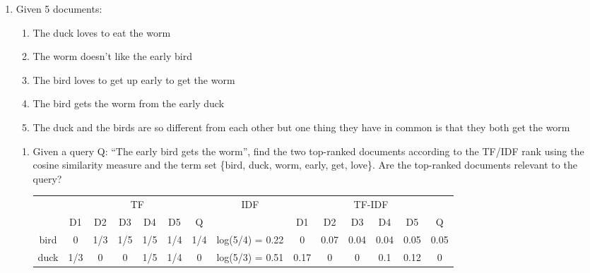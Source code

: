 \documentclass{article}
\newenvironment{QandA}{\begin{enumerate}[label=\arabic*.]}{\end{enumerate}}
\newenvironment{InnerQandA}{\begin{enumerate}[label=\roman*.]}{\end{enumerate}}
\begin{document}
\begin{QandA}
    \item Given 5 documents:
    \begin{enumerate}[label=D\arabic*:]
        \item The duck loves to eat the worm
        \item The worm doesn’t like the early bird
        \item The bird loves to get up early to get the worm
        \item The bird gets the worm from the early duck
        \item The duck and the birds are so different from each other but one thing they have in common is that they both get the worm
    \end{enumerate}
    \begin{InnerQandA}
        \item Given a query Q: ``The early bird gets the worm'', find the two top-ranked documents according to the TF/IDF rank using the cosine similarity measure and the term set \{bird, duck, worm, early, get, love\}. Are the top-ranked documents relevant to the query?
        \begin{table}[h!]
            \centering
            \begin{tabular}{|c|cccccc|c|cccccc|}
            \hline
            \multirow{2}{*}{} & \multicolumn{6}{c|}{TF}                                                                                                                    & \multirow{2}{*}{IDF} & \multicolumn{6}{c|}{TF-IDF}                                                                                                                      \\ \cline{2-7} \cline{9-14} 
                              & \multicolumn{1}{c|}{D1}  & \multicolumn{1}{c|}{D2}  & \multicolumn{1}{c|}{D3}  & \multicolumn{1}{c|}{D4}  & \multicolumn{1}{c|}{D5}  & Q   &                      & \multicolumn{1}{c|}{D1}   & \multicolumn{1}{c|}{D2}   & \multicolumn{1}{c|}{D3}   & \multicolumn{1}{c|}{D4}   & \multicolumn{1}{c|}{D5}   & Q    \\ \hline
            bird              & \multicolumn{1}{c|}{0}   & \multicolumn{1}{c|}{1/3} & \multicolumn{1}{c|}{1/5} & \multicolumn{1}{c|}{1/5} & \multicolumn{1}{c|}{1/4} & 1/4 & log(5/4) = 0.22      & \multicolumn{1}{c|}{0}    & \multicolumn{1}{c|}{0.07} & \multicolumn{1}{c|}{0.04} & \multicolumn{1}{c|}{0.04} & \multicolumn{1}{c|}{0.05} & 0.05 \\ \hline
            duck              & \multicolumn{1}{c|}{1/3} & \multicolumn{1}{c|}{0}   & \multicolumn{1}{c|}{0}   & \multicolumn{1}{c|}{1/5} & \multicolumn{1}{c|}{1/4} & 0   & log(5/3) = 0.51      & \multicolumn{1}{c|}{0.17} & \multicolumn{1}{c|}{0}    & \multicolumn{1}{c|}{0}    & \multicolumn{1}{c|}{0.1}  & \multicolumn{1}{c|}{0.12} & 0    \\ \hline

\end{tabular}
\end{table}
\end{InnerQandA}
\end{QandA}
\end{document}
